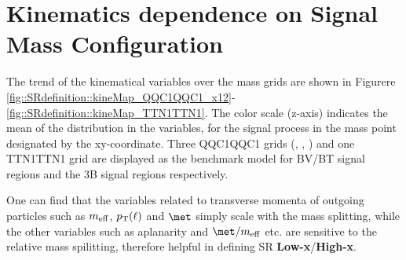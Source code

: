 \section{Kinematics dependence on Signal Mass Configuration} \label{sec::App::kineMap}
The trend of the kinematical variables over the mass grids are shown in Figurere \ref{fig::SRdefinition::kineMap_QQC1QQC1_x12}-\ref{fig::SRdefinition::kineMap_TTN1TTN1}. The color scale (z-axis) indicates the mean of the distribution in the variables, for the signal process in the mass point designated by the xy-coordinate. Three QQC1QQC1 grids (\xhalf, \varx, \DMth) and one TTN1TTN1 grid are displayed as the benchmark model for BV/BT signal regions and the 3B signal regions respectively. 

One can find that the variables related to transverse momenta of outgoing particles such as $m_{\mathrm{eff}}$, $p_{\mathrm{T}}(\ell)$ and $\met$ simply scale with the mass splitting, while the other variables such as aplanarity and $\metOverMeff$ etc. are sensitive to the relative mass spilitting, therefore helpful in defining SR \textbf{Low-x}/\textbf{High-x}.
\clearpage
 

